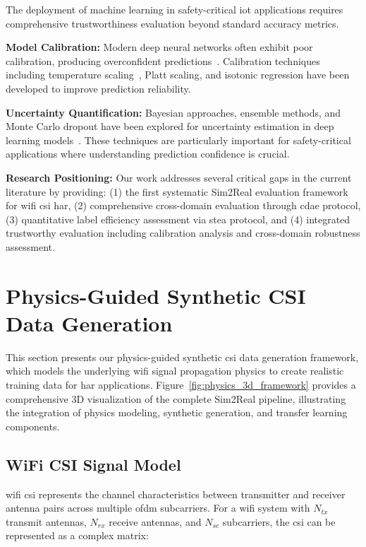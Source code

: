 \documentclass[journal]{IEEEtran}
\begin{document}
The deployment of machine learning in safety-critical \gls{iot} applications requires comprehensive trustworthiness evaluation beyond standard accuracy metrics.

\textbf{Model Calibration:} Modern deep neural networks often exhibit poor calibration, producing overconfident predictions~\cite{calibration_guo2017}. Calibration techniques including temperature scaling~\cite{temperature_scaling2017}, Platt scaling, and isotonic regression have been developed to improve prediction reliability.

\textbf{Uncertainty Quantification:} Bayesian approaches, ensemble methods, and Monte Carlo dropout have been explored for uncertainty estimation in deep learning models~\cite{reliability_assessment2019}. These techniques are particularly important for safety-critical applications where understanding prediction confidence is crucial.

\textbf{Research Positioning:} Our work addresses several critical gaps in the current literature by providing: (1) the first systematic Sim2Real evaluation framework for \gls{wifi} \gls{csi} \gls{har}, (2) comprehensive cross-domain evaluation through \gls{cdae} protocol, (3) quantitative label efficiency assessment via \gls{stea} protocol, and (4) integrated trustworthy evaluation including calibration analysis and cross-domain robustness assessment.

\section{Physics-Guided Synthetic CSI Data Generation}

This section presents our physics-guided synthetic \gls{csi} data generation framework, which models the underlying \gls{wifi} signal propagation physics to create realistic training data for \gls{har} applications. Figure~\ref{fig:physics_3d_framework} provides a comprehensive 3D visualization of the complete Sim2Real pipeline, illustrating the integration of physics modeling, synthetic generation, and transfer learning components.

\subsection{WiFi CSI Signal Model}

\gls{wifi} \gls{csi} represents the channel characteristics between transmitter and receiver antenna pairs across multiple \gls{ofdm} subcarriers. For a \gls{wifi} system with $N_{tx}$ transmit antennas, $N_{rx}$ receive antennas, and $N_{sc}$ subcarriers, the \gls{csi} can be represented as a complex matrix:
\end{document}
